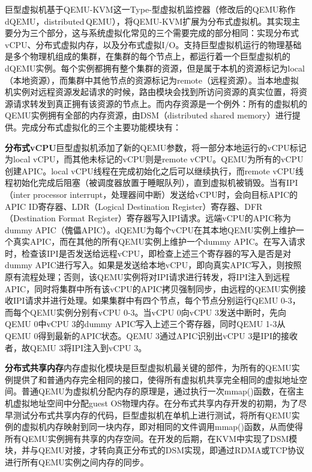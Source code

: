 巨型虚拟机基于QEMU-KVM这一Type-\uppercase\expandafter{}型虚拟机监控器（修改后的QEMU称作dQEMU，distributed\,QEMU），将QEMU-KVM扩展为分布式虚拟机。其实现主要分为三个部分，这与系统虚拟化常见的三个需要完成的部分相同：实现分布式vCPU、分布式虚拟内存，以及分布式虚拟I/O。支持巨型虚拟机运行的物理基础是多个物理机组成的集群，在集群的每个节点上，都运行着一个巨型虚拟机的dQEMU实例。每个实例都拥有整个集群的资源，但是属于本机的资源标记为local（本地资源），而集群中其他节点的资源标记为remote（远程资源）。当本地虚拟机实例对远程资源发起请求的时候，路由模块会找到所访问资源的真实位置，将资源请求转发到真正拥有该资源的节点上。而内存资源是一个例外：所有的虚拟机的QEMU实例拥有全部的内存资源，由DSM（distributed shared memory）进行提供。完成分布式虚拟化的三个主要功能模块有：


\noindent\textbf{分布式vCPU}\quad 巨型虚拟机添加了新的QEMU参数，将一部分本地运行的vCPU标记为local vCPU，而其他未标记的vCPU则是remote vCPU。QEMU为所有的vCPU创建APIC。local vCPU线程在完成初始化之后可以继续执行，而remote vCPU线程初始化完成后阻塞（被调度器放置于睡眠队列），直到虚拟机被销毁。当有IPI（inter processor interrupt，处理器间中断）发送给vCPU时，会向目标APIC的APIC ID寄存器、LDR（Logical Destination Register）寄存器、DFR（Destination Format Register）寄存器写入IPI请求。远端vCPU的APIC称为dummy APIC（傀儡APIC）。dQEMU为每个vCPU在其本地QEMU实例上维护一个真实APIC，而在其他的所有QEMU实例上维护一个dummy APIC。在写入请求时，检查该IPI是否发送给远程vCPU，即检查上述三个寄存器的写入是否是对dummy APIC进行写入。如果是发送给本地vCPU，即向真实APIC写入，则按照原有流程处理；否则，该QEMU实例将对IPI请求进行转发，将IPI注入到远程APIC，同时将集群中所有该vCPU的APIC拷贝强制同步，由远程的QEMU实例接收IPI请求并进行处理。如果集群中有四个节点，每个节点分别运行QEMU 0-3，而每个QEMU实例分别有vCPU 0-3。当vCPU 0向vCPU 3发送中断时，先向QEMU 0中vCPU 3的dummy APIC写入上述三个寄存器，同时QEMU 1-3从QEMU 0得到最新的APIC状态。QEMU 3通过APIC识别出vCPU 3是IPI的接收者，故QEMU 3将IPI注入到vCPU 3。

\noindent\textbf{分布式共享内存}\quad 内存虚拟化模块是巨型虚拟机最关键的部件，为所有的QEMU实例提供了和普通内存完全相同的接口，使得所有虚拟机共享完全相同的虚拟地址空间。普通QEMU为虚拟机分配内存的原理是，通过执行一次mmap()函数，在宿主机虚拟地址空间中分配guest OS物理内存。在分布式共享内存开发的初期，为了尽早测试分布式共享内存的代码，巨型虚拟机在单机上进行测试，将所有QEMU实例的虚拟机内存映射到同一块内存，即对相同的文件调用mmap()函数，从而使得所有QEMU实例拥有共享的内存空间。在开发的后期，在KVM中实现了DSM模块，并与QEMU对接，才转向真正分布式的DSM实现，即通过RDMA或TCP协议进行所有QEMU实例之间内存的同步。

